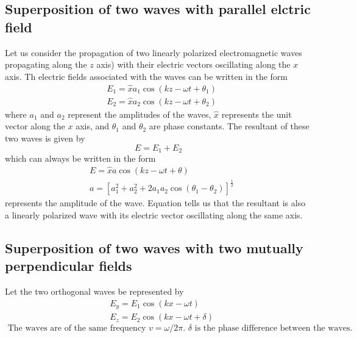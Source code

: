  \subsection{ Superposition of two waves with parallel elctric field}
 Let us consider the propagation of two linearly polarized electromagnetic waves propagating along the $z$ axis) with their electric vectors oscillating along the $x$ axis. Th electric fields associated with the waves can be written in the form
 $$
 \begin{aligned}
 &E_{1}=\hat{x} a_{1} \cos \left(k z-\omega t+\theta_{1}\right) \\
 &E_{2}=\hat{x} a_{2} \cos \left(k z-\omega t+\theta_{2}\right)
 \end{aligned}
 $$
 where $a_{1}$ and $a_{2}$ represent the amplitudes of the waves, $\hat{x}$ represents the unit vector along the $x$ axis, and $\theta_{1}$ and $\theta_{2}$ are phase constants. The resultant of these two waves is given by
 $$
 E=E_{1}+E_{2}
 $$
 which can always be written in the form
 $$
 \begin{aligned}
 &E=\hat{x} a \cos (k z-\omega t+\theta) \\
 &a=\left[a_{1}^{2}+a_{2}^{2}+2 a_{1} a_{2} \cos \left(\theta_{1}-\theta_{2}\right)\right]^{\frac{1}{2}}
 \end{aligned}
 $$
represents the amplitude of the wave. Equation tells us that the resultant is also a linearly polarized wave with its electric vector oscillating along the same axis.
\subsection{Superposition of two waves with two mutually perpendicular fields}
Let the two orthogonal waves be represented by
$$
\begin{aligned}
&E_{y}=E_{1} \cos (k x-\omega t) \\
&E_{z}=E_{2} \cos (k x-\omega t+\delta)
\end{aligned}
$$
$\text { The waves are of the same frequency } v=\omega / 2 \pi \text {. } \delta \text { is the phase difference between the waves. }$
 
